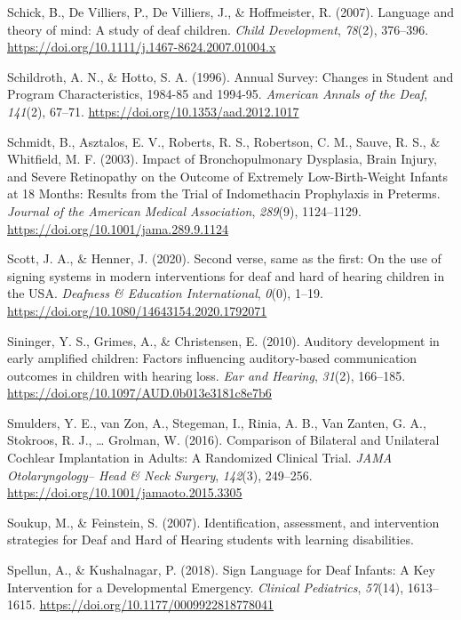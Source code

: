 \documentclass[english,man]{apa6}
\begin{document}
\leavevmode\hypertarget{ref-schick2007}{}%
Schick, B., De Villiers, P., De Villiers, J., \& Hoffmeister, R. (2007). Language and theory of mind: A study of deaf children. \emph{Child Development}, \emph{78}(2), 376--396. \url{https://doi.org/10.1111/j.1467-8624.2007.01004.x}

\leavevmode\hypertarget{ref-schildroth1996}{}%
Schildroth, A. N., \& Hotto, S. A. (1996). Annual Survey: Changes in Student and Program Characteristics, 1984-85 and 1994-95. \emph{American Annals of the Deaf}, \emph{141}(2), 67--71. \url{https://doi.org/10.1353/aad.2012.1017}

\leavevmode\hypertarget{ref-schmidt2003}{}%
Schmidt, B., Asztalos, E. V., Roberts, R. S., Robertson, C. M., Sauve, R. S., \& Whitfield, M. F. (2003). Impact of Bronchopulmonary Dysplasia, Brain Injury, and Severe Retinopathy on the Outcome of Extremely Low-Birth-Weight Infants at 18 Months: Results from the Trial of Indomethacin Prophylaxis in Preterms. \emph{Journal of the American Medical Association}, \emph{289}(9), 1124--1129. \url{https://doi.org/10.1001/jama.289.9.1124}

\leavevmode\hypertarget{ref-scott2020}{}%
Scott, J. A., \& Henner, J. (2020). Second verse, same as the first: On the use of signing systems in modern interventions for deaf and hard of hearing children in the USA. \emph{Deafness \& Education International}, \emph{0}(0), 1--19. \url{https://doi.org/10.1080/14643154.2020.1792071}

\leavevmode\hypertarget{ref-sininger2010}{}%
Sininger, Y. S., Grimes, A., \& Christensen, E. (2010). Auditory development in early amplified children: Factors influencing auditory-based communication outcomes in children with hearing loss. \emph{Ear and Hearing}, \emph{31}(2), 166--185. \url{https://doi.org/10.1097/AUD.0b013e3181c8e7b6}

\leavevmode\hypertarget{ref-smulders2016}{}%
Smulders, Y. E., van Zon, A., Stegeman, I., Rinia, A. B., Van Zanten, G. A., Stokroos, R. J., \ldots{} Grolman, W. (2016). Comparison of Bilateral and Unilateral Cochlear Implantation in Adults: A Randomized Clinical Trial. \emph{JAMA Otolaryngology-- Head \& Neck Surgery}, \emph{142}(3), 249--256. \url{https://doi.org/10.1001/jamaoto.2015.3305}

\leavevmode\hypertarget{ref-soukup2007}{}%
Soukup, M., \& Feinstein, S. (2007). Identification, assessment, and intervention strategies for Deaf and Hard of Hearing students with learning disabilities.

\leavevmode\hypertarget{ref-spellun2018}{}%
Spellun, A., \& Kushalnagar, P. (2018). Sign Language for Deaf Infants: A Key Intervention for a Developmental Emergency. \emph{Clinical Pediatrics}, \emph{57}(14), 1613--1615. \url{https://doi.org/10.1177/0009922818778041}
\end{document}
